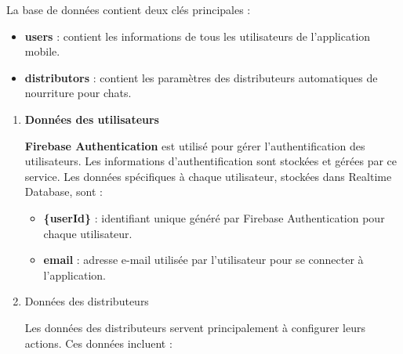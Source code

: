 La base de données contient deux clés principales :

\begin{itemize}
\item \textbf{users} : contient les informations de tous les utilisateurs de l'application mobile.
\item \textbf{distributors} : contient les paramètres des distributeurs automatiques de nourriture pour chats.
\end{itemize}

\begin{enumerate}[label=\alph*)]
\item \textbf{Données des utilisateurs} 

\textbf{Firebase Authentication} est utilisé pour gérer l'authentification des utilisateurs. Les informations d'authentification sont stockées et gérées par ce service. Les données spécifiques à chaque utilisateur, stockées dans Realtime Database, sont :

\begin{itemize}
\item \textbf{\{userId\}} : identifiant unique généré par Firebase Authentication pour chaque utilisateur.
\item \textbf{email} : adresse e-mail utilisée par l'utilisateur pour se connecter à l'application.
\end{itemize}

\item{Données des distributeurs} 

Les données des distributeurs servent principalement à configurer leurs actions. Ces données incluent :


\end{enumerate}
